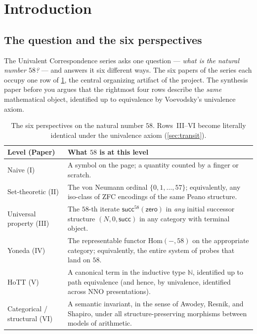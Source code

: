 \documentclass[12pt]{article}
\theoremstyle{definition}
\theoremstyle{remark}
\newcommand{\N}{\mathbb{N}}
\newcommand{\Hom}{\mathrm{Hom}}
\newcommand{\zero}{\mathsf{zero}}
\newcommand{\suc}{\mathsf{succ}}
\begin{document}
\tableofcontents
\bigskip

\section{Introduction}
\label{sec:intro}

\subsection{The question and the six perspectives}

The Univalent Correspondence series asks one question --- \emph{what is the
natural number $58$?} --- and answers it six different ways. The six papers
of the series each occupy one row of \cref{tab:six-rows}, the central
organizing artifact of the project. The synthesis paper before you argues
that the rightmost four rows describe the \emph{same} mathematical object,
identified up to equivalence by Voevodsky's univalence axiom.

\begin{table}[ht]
\centering
\begin{tabularx}{\textwidth}{l X}
\toprule
\textbf{Level (Paper)} & \textbf{What $58$ is at this level} \\
\midrule
Naive (I) & A symbol on the page; a quantity counted by a finger or scratch. \\
Set-theoretic (II) & The von Neumann ordinal $\{0, 1, \ldots, 57\}$; equivalently, any iso-class of ZFC encodings of the same Peano structure. \\
Universal property (III) & The $58$-th iterate $\suc^{58}(\zero)$ in \emph{any} initial successor structure $(N, 0, \suc)$ in any category with terminal object. \\
Yoneda (IV) & The representable functor $\Hom(-, 58)$ on the appropriate category; equivalently, the entire system of probes that land on $58$. \\
HoTT (V) & A canonical term in the inductive type $\N$, identified up to path equivalence (and hence, by univalence, identified across NNO presentations). \\
Categorical / structural (VI) & A semantic invariant, in the sense of Awodey, Resnik, and Shapiro, under all structure-preserving morphisms between models of arithmetic. \\
\bottomrule
\end{tabularx}
\caption{The six perspectives on the natural number $58$. Rows~III--VI
become literally identical under the univalence axiom (\cref{sec:transit}).}
\label{tab:six-rows}
\end{table}
\end{document}
